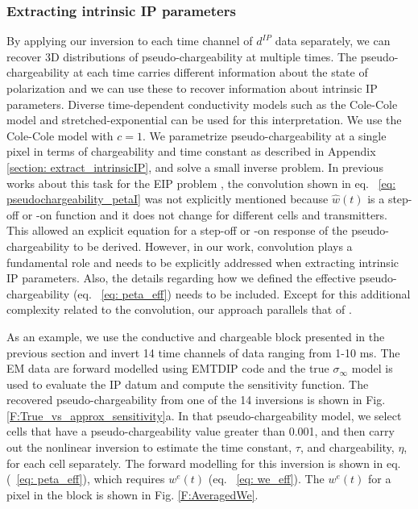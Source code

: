 \documentclass[extra,mreferee]{gji}
\newcommand{\siginf}{\sigma_\infty}
\newcommand{\dip}{d^{IP}}
\begin{document}
\subsubsection{Extracting intrinsic IP parameters}
By applying our inversion to each time channel of $\dip$ data separately, we can recover 3D distributions of pseudo-chargeability at multiple times.
The pseudo-chargeability at each time carries different information about the state of polarization and we can use these to recover information about intrinsic IP parameters.
Diverse time-dependent conductivity models such as the Cole-Cole model and stretched-exponential can be used for this interpretation.
We use the Cole-Cole model with $c=1$.
We parametrize pseudo-chargeability at a single pixel in terms of chargeability and time constant as described in Appendix \ref{section: extract_intrinsicIP}, and solve a small inverse problem.
In previous works about this task for the EIP problem \cite[]{Yuval1997,Hordt2006}, the convolution shown in eq. ~\ref{eq: pseudochargeability_petaI} was not explicitly mentioned because $\hat{w}(t)$ is a step-off or -on function and it does not change for different cells and transmitters. This allowed an explicit equation for a step-off or -on response of the pseudo-chargeability to be derived.
However, in our work, convolution plays a fundamental role and needs to be explicitly addressed when extracting intrinsic IP parameters. Also, the details regarding how we defined the effective pseudo-chargeability (eq. ~\ref{eq: peta_eff}) needs to be included.  Except for this additional complexity related to the convolution, our approach parallels that of \cite{Yuval1997,Hordt2006}.

As an example, we use the conductive and chargeable block presented in the previous section and invert 14 time channels of data ranging from 1-10 ms.  The EM data are forward modelled using EMTDIP code and the true $\siginf$ model is used  to evaluate the IP datum and compute the sensitivity function. The recovered pseudo-chargeability from one of the 14 inversions is shown in Fig. \ref{F:True_vs_approx_sensitivity}a. In that pseudo-chargeability model, we select cells that have a pseudo-chargeability value greater than 0.001, and then carry out the nonlinear inversion to estimate the time constant, $\tau$,  and chargeability, $\eta$, for each cell separately. The forward modelling for this inversion is shown in eq. (~\ref{eq: peta_eff}), which requires $w^e(t)$ (eq. ~\ref{eq: we_eff}).
The $w^e(t)$ for a pixel in the block is shown in Fig. \ref{F:AveragedWe}.
\end{document}
